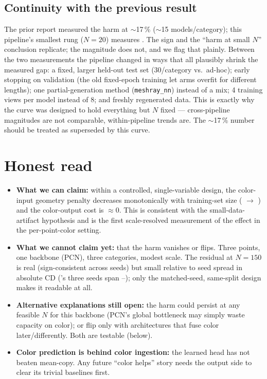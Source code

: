 \documentclass[11pt]{article}
\begin{document}
\subsection{Continuity with the previous result}\label{sec:continuity}

The prior report measured the harm at $\sim$17\,\% ($\sim$15 models/category); this
pipeline's smallest rung ($N{=}20$) measures \worse{\gapCtwenty}. The sign and the
``harm at small $N$'' conclusion replicate; the magnitude does not, and we flag that
plainly. Between the two measurements the pipeline changed in ways that all plausibly
shrink the measured gap: a fixed, larger held-out test set (30/category vs.\ ad-hoc);
early stopping on validation (the old fixed-epoch training let arms overfit for
different lengths); one partial-generation method (\texttt{meshray\_nn}) instead of a
mix; 4 training views per model instead of 8; and freshly regenerated data. This is
exactly why the curve was designed to hold everything but $N$ fixed --- cross-pipeline
magnitudes are not comparable, within-pipeline trends are. The $\sim$17\,\% number
should be treated as superseded by this curve.

\section{Honest read}\label{sec:read}

\begin{itemize}
  \item \textbf{What we can claim:} within a controlled, single-variable design, the
  color-input geometry penalty decreases monotonically with training-set size
  (\worse{\gapCtwenty} $\rightarrow$ \worse{\gapConefifty}) and the color-output cost is
  $\approx$0. This is consistent with the small-data-artifact hypothesis and is the
  first scale-resolved measurement of the effect in the per-point-color setting.
  \item \textbf{What we cannot claim yet:} that the harm vanishes or flips. Three points,
  one backbone (PCN), three categories, modest scale. The residual \worse{\gapConefifty}
  at $N{=}150$ is real (sign-consistent across seeds) but small relative to seed spread
  in absolute CD ('s three seeds span \cdAonefiftyLo--\cdAonefiftyHi); only the
  matched-seed, same-split design makes it readable at all.
  \item \textbf{Alternative explanations still open:} the harm could persist at any
  feasible $N$ for this backbone (PCN's global bottleneck may simply waste capacity on
  color); or flip only with architectures that fuse color later/differently. Both are
  testable (below).
  \item \textbf{Color prediction is behind color ingestion:} the learned head has not
  beaten mean-copy. Any future ``color helps'' story needs the output side to clear its
  trivial baselines first.
\end{itemize}
\end{document}
